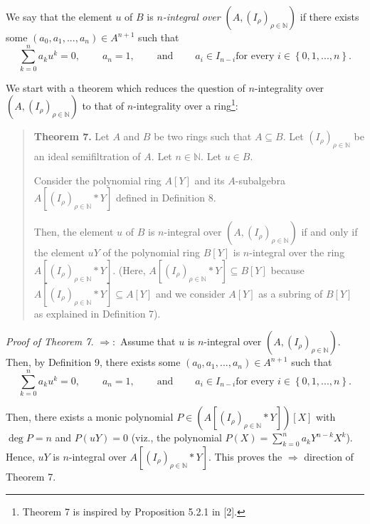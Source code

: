 \documentclass[12pt,final,notitlepage,onecolumn]{article}%
\begin{document}
We say that the element $u$ of $B$ is $n$\textit{-integral over }$\left(
A,\left(  I_{\rho}\right)  _{\rho\in\mathbb{N}}\right)  $ if there exists some
$\left(  a_{0},a_{1},...,a_{n}\right)  \in A^{n+1}$ such that%
\[
\sum\limits_{k=0}^{n}a_{k}u^{k}=0,\ \ \ \ \ \ \ \ \ \ a_{n}%
=1,\ \ \ \ \ \ \ \ \ \ \text{and}\ \ \ \ \ \ \ \ \ \ a_{i}\in I_{n-i}\text{
for every }i\in\left\{  0,1,...,n\right\}  .
\]


We start with a theorem which reduces the question of $n$-integrality over
$\left(  A,\left(  I_{\rho}\right)  _{\rho\in\mathbb{N}}\right)  $ to that of
$n$-integrality over a ring\footnote{Theorem 7 is inspired by Proposition
5.2.1 in [2].}:

\begin{quote}
\textbf{Theorem 7.} Let $A$ and $B$ be two rings such that $A\subseteq B$. Let
$\left(  I_{\rho}\right)  _{\rho\in\mathbb{N}}$ be an ideal semifiltration of
$A$. Let $n\in\mathbb{N}$. Let $u\in B$.

Consider the polynomial ring $A\left[  Y\right]  $ and its $A$-subalgebra
$A\left[  \left(  I_{\rho}\right)  _{\rho\in\mathbb{N}}\ast Y\right]  $
defined in Definition 8.

Then, the element $u$ of $B$ is $n$-integral over $\left(  A,\left(  I_{\rho
}\right)  _{\rho\in\mathbb{N}}\right)  $ if and only if the element $uY$ of
the polynomial ring $B\left[  Y\right]  $ is $n$-integral over the ring
$A\left[  \left(  I_{\rho}\right)  _{\rho\in\mathbb{N}}\ast Y\right]  .$
(Here, $A\left[  \left(  I_{\rho}\right)  _{\rho\in\mathbb{N}}\ast Y\right]
\subseteq B\left[  Y\right]  $ because $A\left[  \left(  I_{\rho}\right)
_{\rho\in\mathbb{N}}\ast Y\right]  \subseteq A\left[  Y\right]  $ and we
consider $A\left[  Y\right]  $ as a subring of $B\left[  Y\right]  $ as
explained in Definition 7).
\end{quote}

\textit{Proof of Theorem 7.} $\Longrightarrow:$ Assume that $u$ is
$n$-integral over $\left(  A,\left(  I_{\rho}\right)  _{\rho\in\mathbb{N}%
}\right)  $. Then, by Definition 9, there exists some $\left(  a_{0}%
,a_{1},...,a_{n}\right)  \in A^{n+1}$ such that%
\[
\sum\limits_{k=0}^{n}a_{k}u^{k}=0,\ \ \ \ \ \ \ \ \ \ a_{n}%
=1,\ \ \ \ \ \ \ \ \ \ \text{and}\ \ \ \ \ \ \ \ \ \ a_{i}\in I_{n-i}\text{
for every }i\in\left\{  0,1,...,n\right\}  .
\]


Then, there exists a monic polynomial $P\in\left(  A\left[  \left(  I_{\rho
}\right)  _{\rho\in\mathbb{N}}\ast Y\right]  \right)  \left[  X\right]  $ with
$\deg P=n$ and $P\left(  uY\right)  =0$ (viz., the polynomial $P\left(
X\right)  =\sum\limits_{k=0}^{n}a_{k}Y^{n-k}X^{k}$). Hence, $uY$ is
$n$-integral over $A\left[  \left(  I_{\rho}\right)  _{\rho\in\mathbb{N}}\ast
Y\right]  $. This proves the $\Longrightarrow$ direction of Theorem 7.
\end{document}

